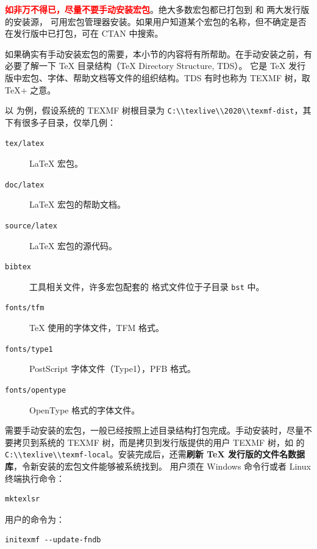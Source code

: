 \textbf{\textcolor{red}{如非万不得已，尽量不要手动安装宏包}}。绝大多数宏包都已打包到  和  两大发行版的安装源，
可用宏包管理器安装。如果用户知道某个宏包的名称，但不确定是否在发行版中已打包，可在 CTAN 中搜索。

如果确实有手动安装宏包的需要，本小节的内容将有所帮助。在手动安装之前，有必要了解一下 \TeX{} 目录结构（\TeX{} Directory Structure, TDS）。
它是 \TeX{} 发行版中宏包、字体、帮助文档等文件的组织结构。TDS 有时也称为 TEXMF 树，取 \TeX$+$ 之意。

以  为例，假设系统的 TEXMF 树根目录为 \nolinkurl{C:\\texlive\\2020\\texmf-dist}，其下有很多子目录，仅举几例：
\begin{description}
  \item[\texttt{tex/latex}] \LaTeX{} 宏包。
  \item[\texttt{doc/latex}] \LaTeX{} 宏包的帮助文档。
  \item[\texttt{source/latex}] \LaTeX{} 宏包的源代码。
  \item[\texttt{bibtex}]  工具相关文件，许多宏包配套的  格式文件位于子目录 \texttt{bst} 中。
  \item[\texttt{fonts/tfm}] \TeX{} 使用的字体文件，TFM 格式。
  \item[\texttt{fonts/type1}] PostScript 字体文件（Type1），PFB 格式。
  \item[\texttt{fonts/opentype}] OpenType 格式的字体文件。
\end{description}

需要手动安装的宏包，一般已经按照上述目录结构打包完成。手动安装时，尽量不要拷贝到系统的 TEXMF 树，而是拷贝到发行版提供的用户 TEXMF 树，如
 的 \nolinkurl{C:\\texlive\\texmf-local}。安装完成后，还需\textbf{刷新 \TeX{} 发行版的文件名数据库}，令新安装的宏包文件能够被系统找到。
 用户须在 Windows 命令行或者 Linux 终端执行命令：
\begin{verbatim}
mktexlsr
\end{verbatim}
 用户的命令为：
\begin{verbatim}
initexmf --update-fndb
\end{verbatim}

\endinput
